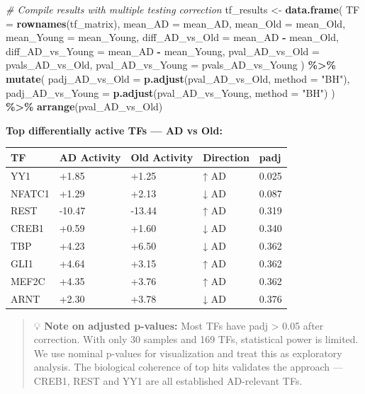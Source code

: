 \documentclass[
]{article}
\newenvironment{Shaded}{\begin{snugshade}}{\end{snugshade}}
\newcommand{\AttributeTok}[1]{\textcolor[rgb]{0.13,0.29,0.53}{#1}}
\newcommand{\CommentTok}[1]{\textcolor[rgb]{0.56,0.35,0.01}{\textit{#1}}}
\newcommand{\FunctionTok}[1]{\textcolor[rgb]{0.13,0.29,0.53}{\textbf{#1}}}
\newcommand{\NormalTok}[1]{#1}
\newcommand{\OtherTok}[1]{\textcolor[rgb]{0.56,0.35,0.01}{#1}}
\newcommand{\SpecialCharTok}[1]{\textcolor[rgb]{0.81,0.36,0.00}{\textbf{#1}}}
\newcommand{\StringTok}[1]{\textcolor[rgb]{0.31,0.60,0.02}{#1}}
\begin{document}
\begin{Shaded}
\begin{Highlighting}[]
\CommentTok{\# Compile results with multiple testing correction}
\NormalTok{tf\_results }\OtherTok{\textless{}{-}} \FunctionTok{data.frame}\NormalTok{(}
    \AttributeTok{TF               =} \FunctionTok{rownames}\NormalTok{(tf\_matrix),}
    \AttributeTok{mean\_AD          =}\NormalTok{ mean\_AD,}
    \AttributeTok{mean\_Old         =}\NormalTok{ mean\_Old,}
    \AttributeTok{mean\_Young       =}\NormalTok{ mean\_Young,}
    \AttributeTok{diff\_AD\_vs\_Old   =}\NormalTok{ mean\_AD }\SpecialCharTok{{-}}\NormalTok{ mean\_Old,}
    \AttributeTok{diff\_AD\_vs\_Young =}\NormalTok{ mean\_AD }\SpecialCharTok{{-}}\NormalTok{ mean\_Young,}
    \AttributeTok{pval\_AD\_vs\_Old   =}\NormalTok{ pvals\_AD\_vs\_Old,}
    \AttributeTok{pval\_AD\_vs\_Young =}\NormalTok{ pvals\_AD\_vs\_Young}
\NormalTok{) }\SpecialCharTok{\%\textgreater{}\%}
    \FunctionTok{mutate}\NormalTok{(}
        \AttributeTok{padj\_AD\_vs\_Old   =} \FunctionTok{p.adjust}\NormalTok{(pval\_AD\_vs\_Old, }\AttributeTok{method =} \StringTok{"BH"}\NormalTok{),}
        \AttributeTok{padj\_AD\_vs\_Young =} \FunctionTok{p.adjust}\NormalTok{(pval\_AD\_vs\_Young, }\AttributeTok{method =} \StringTok{"BH"}\NormalTok{)}
\NormalTok{    ) }\SpecialCharTok{\%\textgreater{}\%}
    \FunctionTok{arrange}\NormalTok{(pval\_AD\_vs\_Old)}
\end{Highlighting}
\end{Shaded}

\textbf{Top differentially active TFs --- AD vs Old:}

\begin{longtable}[]{@{}lllll@{}}
\toprule\noalign{}
TF & AD Activity & Old Activity & Direction & padj \\
\midrule\noalign{}
\endhead
\bottomrule\noalign{}
\endlastfoot
YY1 & +1.85 & +1.25 & ↑ AD & 0.025 \\
NFATC1 & +1.29 & +2.13 & ↓ AD & 0.087 \\
REST & -10.47 & -13.44 & ↑ AD & 0.319 \\
CREB1 & +0.59 & +1.60 & ↓ AD & 0.340 \\
TBP & +4.23 & +6.50 & ↓ AD & 0.362 \\
GLI1 & +4.64 & +3.15 & ↑ AD & 0.362 \\
MEF2C & +4.35 & +3.76 & ↑ AD & 0.362 \\
ARNT & +2.30 & +3.78 & ↓ AD & 0.376 \\
\end{longtable}

\begin{quote}
💡 \textbf{Note on adjusted p-values:} Most TFs have padj \textgreater{}
0.05 after correction. With only 30 samples and 169 TFs, statistical
power is limited. We use nominal p-values for visualization and treat
this as exploratory analysis. The biological coherence of top hits
validates the approach --- CREB1, REST and YY1 are all established
AD-relevant TFs.
\end{quote}
\end{document}
